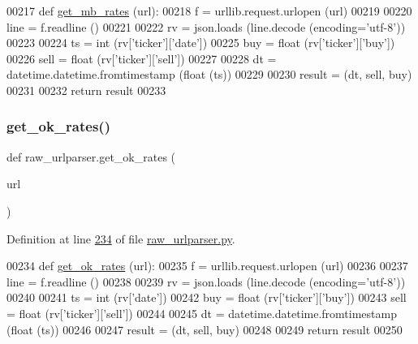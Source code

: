 \begin{DoxyCode}
00217 \textcolor{keyword}{def }\hyperlink{namespaceraw__urlparser_ae2341143e866401a993a5a964610f7a6}{get\_mb\_rates} (url):
00218     f = urllib.request.urlopen (url)
00219     
00220     line = f.readline ()
00221     
00222     rv = json.loads (line.decode (encoding=\textcolor{stringliteral}{'utf-8'}))
00223     
00224     ts   = int   (rv[\textcolor{stringliteral}{'ticker'}][\textcolor{stringliteral}{'date'}])
00225     buy  = float (rv[\textcolor{stringliteral}{'ticker'}][\textcolor{stringliteral}{'buy'}])
00226     sell = float (rv[\textcolor{stringliteral}{'ticker'}][\textcolor{stringliteral}{'sell'}])
00227     
00228     dt = datetime.datetime.fromtimestamp (float (ts))
00229     
00230     result = (dt, sell, buy)
00231     
00232     \textcolor{keywordflow}{return} result
00233 
\end{DoxyCode}
\mbox{\label{namespaceraw__urlparser_aaf342c097e3df48d46b7296e8177d737}} 
\subsubsection{\texorpdfstring{get\+\_\+ok\+\_\+rates()}{get\_ok\_rates()}}
{\footnotesize\ttfamily def raw\+\_\+urlparser.\+get\+\_\+ok\+\_\+rates (\begin{DoxyParamCaption}\item[{}]{url }\end{DoxyParamCaption})}



Definition at line \hyperlink{raw__urlparser_8py_source_l00234}{234} of file \hyperlink{raw__urlparser_8py_source}{raw\+\_\+urlparser.\+py}.


\begin{DoxyCode}
00234 \textcolor{keyword}{def }\hyperlink{namespaceraw__urlparser_aaf342c097e3df48d46b7296e8177d737}{get\_ok\_rates} (url):
00235     f = urllib.request.urlopen (url)
00236     
00237     line = f.readline ()
00238     
00239     rv = json.loads (line.decode (encoding=\textcolor{stringliteral}{'utf-8'}))
00240     
00241     ts   = int   (rv[\textcolor{stringliteral}{'date'}])
00242     buy  = float (rv[\textcolor{stringliteral}{'ticker'}][\textcolor{stringliteral}{'buy'}])
00243     sell = float (rv[\textcolor{stringliteral}{'ticker'}][\textcolor{stringliteral}{'sell'}])
00244     
00245     dt = datetime.datetime.fromtimestamp (float (ts))
00246     
00247     result = (dt, sell, buy)
00248     
00249     \textcolor{keywordflow}{return} result
00250     
\end{DoxyCode}
\mbox{\label{namespaceraw__urlparser_ab9602b24afd1ae28d96beb085c37410e}} 
